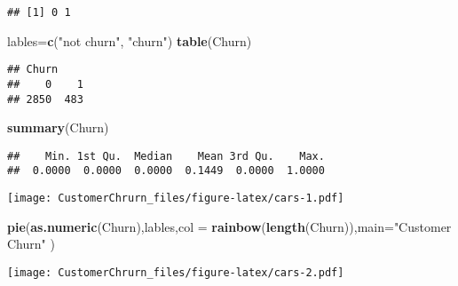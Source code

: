 \documentclass[]{article}
\newenvironment{Shaded}{\begin{snugshade}}{\end{snugshade}}
\newcommand{\KeywordTok}[1]{\textcolor[rgb]{0.13,0.29,0.53}{\textbf{#1}}}
\newcommand{\DataTypeTok}[1]{\textcolor[rgb]{0.13,0.29,0.53}{#1}}
\newcommand{\StringTok}[1]{\textcolor[rgb]{0.31,0.60,0.02}{#1}}
\newcommand{\OperatorTok}[1]{\textcolor[rgb]{0.81,0.36,0.00}{\textbf{#1}}}
\newcommand{\NormalTok}[1]{#1}
\begin{document}
\begin{verbatim}
## [1] 0 1
\end{verbatim}

\begin{Shaded}
\begin{Highlighting}[]
\NormalTok{lables=}\KeywordTok{c}\NormalTok{(}\StringTok{"not churn"}\NormalTok{, }\StringTok{"churn"}\NormalTok{)}
\KeywordTok{table}\NormalTok{(Churn)}
\end{Highlighting}
\end{Shaded}

\begin{verbatim}
## Churn
##    0    1 
## 2850  483
\end{verbatim}

\begin{Shaded}
\begin{Highlighting}[]
\KeywordTok{summary}\NormalTok{(Churn)}
\end{Highlighting}
\end{Shaded}

\begin{verbatim}
##    Min. 1st Qu.  Median    Mean 3rd Qu.    Max. 
##  0.0000  0.0000  0.0000  0.1449  0.0000  1.0000
\end{verbatim}

\begin{Shaded}
\end{Shaded}

\texttt{[image: CustomerChrurn\_files/figure-latex/cars-1.pdf]}

\begin{Shaded}
\begin{Highlighting}[]
\KeywordTok{pie}\NormalTok{(}\KeywordTok{as.numeric}\NormalTok{(Churn),lables,}\DataTypeTok{col =} \KeywordTok{rainbow}\NormalTok{(}\KeywordTok{length}\NormalTok{(Churn)),}\DataTypeTok{main=}\StringTok{"Customer Churn"}\NormalTok{ )}
\end{Highlighting}
\end{Shaded}

\texttt{[image: CustomerChrurn\_files/figure-latex/cars-2.pdf]}
\end{document}
